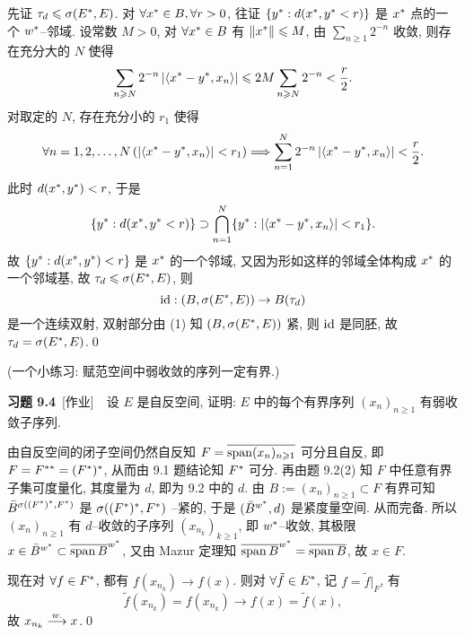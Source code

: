 \begin{Proof}
    先证 $ \tau_{d}\leqslant\sigma(E^{*}, E) $. 对 $ \forall x^{*}\in B, \forall r>0 $, 往证 $ \{ y^{*}: d(x^{*}, y^{*}<r) \} $ 是 $ x^{*} $ 点的一个 $ w^{*} $--邻域. 设常数 $ M>0 $, 对 $ \forall x^{*}\in B $ 有 $ \left\| x^{*} \right\|\leqslant M $, 由 $ \sum\limits_{n\geqslant1}2^{-n} $ 收敛, 则存在充分大的 $ N $ 使得
    \[
        \sum_{n\geqslant N}2^{-n}\left| \left\langle x^{*}-y^{*}, x_{n} \right\rangle \right| \leqslant 2M\sum_{n\geqslant N}2^{-n}<\frac{r}{2}.
    \]
    对取定的 $ N $, 存在充分小的 $ r_{1} $ 使得
    \[
        \forall n=1, 2, \dots, N\,(\left| \left\langle x^{*}-y^{*}, x_{n} \right\rangle \right| <r_{1})\Longrightarrow \sum_{n=1}^{N} 2^{-n}\left| \left\langle x^{*}-y^{*}, x_{n} \right\rangle \right| <\frac{r}{2}.
    \]
    此时 $ d(x^{*}, y^{*})<r $, 于是
    \[
        \{ y^{*}:d(x^{*}, y^{*}<r) \}\supset \bigcap_{n=1}^{N}\{ y^{*}:\left| \left\langle x^{*}-y^{*}, x_{n} \right\rangle \right| <r_{1} \}.
    \]
    故 $ \{ y^{*}: d(x^{*}, y^{*})<r \} $ 是 $ x^{*} $ 的一个邻域, 又因为形如这样的邻域全体构成 $ x^{*} $ 的一个邻域基, 故 $ \tau_{d}\leqslant\sigma(E^{*}, E) $, 则
    \[
        \mathrm{id}: (B, \sigma(E^{*}, E))\to B(\tau_{d})
    \]
    是一个连续双射, 双射部分由 (1) 知 $ (B, \sigma(E^{*}, E)) $ 紧, 则 $ \mathrm{id} $ 是同胚, 故 $ \tau_{d}=\sigma(E^{*}, E) $.\qed
    \end{Proof}

    (一个小练习: 赋范空间中弱收敛的序列一定有界.)

    \textbf{习题 9.4}\ [作业]\ \ 设 $ E $ 是自反空间, 证明: $ E $ 中的每个有界序列 $ (x_{n})_{n\geqslant1} $ 有弱收敛子序列.
    \begin{Proof}
        由自反空间的闭子空间仍然自反知 $ F=\overline{\operatorname{span}(x_{n})_{n\geqslant1}} $ 可分且自反, 即 $ F=F^{**}=(F^{*})^{*} $, 从而由 9.1 题结论知 $ F^{*} $ 可分. 再由题 9.2(2) 知 $ F $ 中任意有界子集可度量化, 其度量为 $ d $, 即为 9.2 中的 $ d $. 由 $ B:=(x_{n})_{n\geqslant1}\subset F $ 有界可知 $ \bar{B}^{\sigma((F^{*})^{*}, F^{*})} $ 是 $ \sigma((F^{*})^{*}, F^{*}) $ --紧的, 于是 $ (\bar{B}^{w^{*}}, d) $ 是紧度量空间. 从而完备. 所以 $ (x_{n})_{n\geqslant1} $ 有 $ d $--收敛的子序列 $ (x_{n_{k}})_{k\geqslant1} $, 即 $ w^{*} $--收敛, 其极限 $ x\in\bar{B}^{w^{*}}\subset\overline{\operatorname{span} B}^{w^{*}} $, 又由 Mazur 定理知 $ \overline{\operatorname{span} B}^{w^{*}}=\overline{\operatorname{span} B} $, 故 $ x\in F $.

        现在对 $ \forall f\in F^{*} $, 都有 $  f(x_{n_{k}})\to f(x) $. 则对 $ \forall \tilde{f}\in E^{*} $, 记 $ f = \tilde{f}|_{F} $, 有
        \[
            \tilde{f}(x_{n_{k}})=f(x_{n_{k}})\to f(x)=\tilde{f}(x),
        \]
        故 $ x_{n_{k}}\overset{w.}{\longrightarrow} x $.\qed
    \end{Proof}

